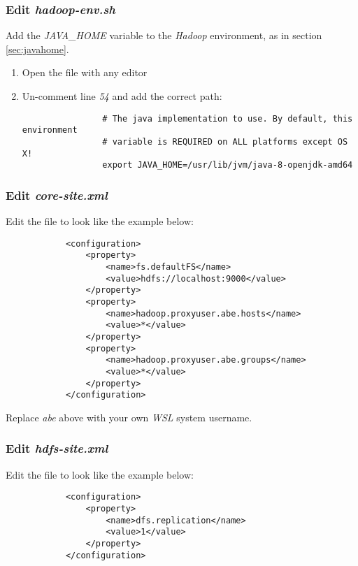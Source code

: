 \documentclass{article}
\begin{document}
        \subsubsection{Edit \emph{hadoop-env.sh}}
        Add the \emph{JAVA\_HOME} variable to the \emph{Hadoop} environment, as in section \ref{sec:javahome}.

        \begin{enumerate}
            \item Open the file  with any editor
            
            \item Un-comment line \emph{54} and add the correct path:
            \begin{verbatim}
                # The java implementation to use. By default, this environment
                # variable is REQUIRED on ALL platforms except OS X!
                export JAVA_HOME=/usr/lib/jvm/java-8-openjdk-amd64
            \end{verbatim}
        \end{enumerate}

        \subsubsection{Edit \emph{core-site.xml}}
        Edit the file  to look like the example below:
        \begin{verbatim}
            <configuration>
                <property>
                    <name>fs.defaultFS</name>
                    <value>hdfs://localhost:9000</value>
                </property>
                <property>
                    <name>hadoop.proxyuser.abe.hosts</name>
                    <value>*</value>
                </property>
                <property>
                    <name>hadoop.proxyuser.abe.groups</name>
                    <value>*</value>
                </property>
            </configuration>
        \end{verbatim}
        Replace \emph{abe} above with your own \emph{WSL} system username.

        \subsubsection{Edit \emph{hdfs-site.xml}}
        Edit the file  to look like the example below:
        \begin{verbatim}
            <configuration>
                <property>
                    <name>dfs.replication</name>
                    <value>1</value>
                </property>
            </configuration>
        \end{verbatim}
        
\end{document}
